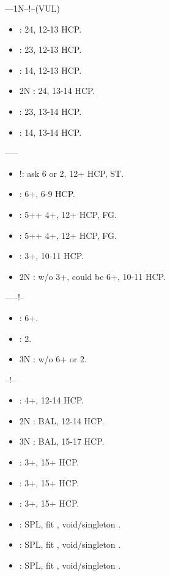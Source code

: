 \documentclass[12pt,twoside,a5paper]{report}%
\begin{document}
	----1N--!--(VUL)
	\begin{itemize}
	\renewcommand{\labelitemi}{}
	\item {} : 2\di{}4\cl{}, 12-13 HCP.
	\item {} : 2\di{}3\cl{}, 12-13 HCP.
	\item {} : 1\di{}4\cl{}, 12-13 HCP.
	\item 2N : 2\di{}4\cl{}, 13-14 HCP.
	\item {} : 2\di{}3\cl{}, 13-14 HCP.
	\item {} : 1\di{}4\cl{}, 13-14 HCP.
	\end{itemize}

	------
	\begin{itemize}
	\renewcommand{\labelitemi}{}
	\item {}!: ask 6\cl{} or 2\di{}, 12+ HCP, ST.
	\item {} : 6+\di{}, 6-9 HCP.
	\item {} : 5+\di{}+ 4+\he{}, 12+ HCP, FG.
	\item {} : 5+\di{}+ 4+\sp{}, 12+ HCP, FG.
	\item {} : 3+\cl{}, 10-11 HCP.
	\item 2N : w/o 3+\cl{}, could be 6+\di{}, 10-11 HCP.
	\end{itemize}

	------!--
	\begin{itemize}
	\renewcommand{\labelitemi}{}
	\item {} : 6+\cl{}.
	\item {} : 2\di{}.
	\item 3N : w/o  6+\cl{} or 2\di{}.
	\end{itemize}

	--!--
	\begin{itemize}
	\renewcommand{\labelitemi}{}
	\item {} : 4+\cl{}, 12-14 HCP.
	\item 2N : BAL, 12-14 HCP.
	\item 3N : BAL, 15-17 HCP.
	\item {} : 3+\di{}, 15+ HCP.
	\item {} : 3+\he{}, 15+ HCP.
	\item {} : 3+\sp{}, 15+ HCP.
	\item {} : SPL, fit \cl{}, void/singleton \di{}.
	\item {} : SPL, fit \cl{}, void/singleton \he{}.
	\item {} : SPL, fit \cl{}, void/singleton \sp{}.
	\end{itemize}
	
\end{document}
